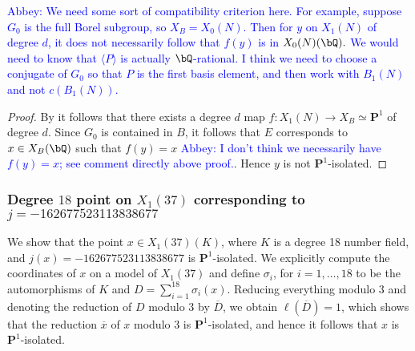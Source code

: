 \documentclass[11pt,reqno]{amsart}
\theoremstyle{plain}
\theoremstyle{definition}
\newcommand{\Q}{\bQ}
\newcommand{\PP}{\mathbf P}
\newcommand{\filip}[1]{{\textcolor{cyan}{Filip: [#1]}}}
\newcommand{\abbey}[1]{\textcolor{blue}{Abbey: #1}}
\newcommand{\sachi}[1]{\textcolor{purple}{Sachi: #1}}
\begin{document}
\abbey{We need some sort of compatibility criterion here. For example, suppose $G_0$ is the full Borel subgroup, so $X_B=X_0(N)$. Then for $y$ on $X_1(N)$ of degree $d$, it does not necessarily follow that $f(y)$ is in $X_0(N)(\Q).$ We would need to know that $\langle P \rangle$ is actually $\Q$-rational. I think we need to choose a conjugate of $G_0$ so that $P$ is the first basis element, and then work with $B_1(N)$ and not $c(B_1(N))$.}

\begin{proof}
    By  it follows that there exists a degree $d$ map $f\colon X_1(N)\rightarrow X_B\simeq \PP^1$ of degree $d$. Since $G_0$ is contained in $B$, it follows that $E$ corresponds to  $x\in X_B(\Q)$ such that $f(y)=x$ \abbey{I don't think we necessarily have $f(y)=x$; see comment directly above proof.}. Hence $y$ is not $\PP^1$-isolated.
\end{proof}

\fi


\subsubsection{Degree $18$ point on $X_1(37)$ corresponding to $j=-162677523113838677$}

We show that the point $x\in X_1(37)(K)$, where $K$ is a degree 18 number field, and $j(x)=-162677523113838677$ is $\PP^1$-isolated. We explicitly compute the coordinates of $x$ on a model of $X_1(37)$ and define  $\sigma_i$, for $i=1,\ldots, 18$ to be the automorphisms of $K$ and $D=\sum_{i=1}^{18}\sigma_i(x)$. Reducing everything modulo $3$ and denoting the reduction of $D$ modulo $3$ by $\overline{D}$, we obtain $\ell(\overline{D})=1$, which shows that the reduction
$\overline{x}$ of $x$ modulo 3 is $\PP^1$-isolated, and hence it follows that $x$ is $\PP^1$-isolated.  %
\end{document}
